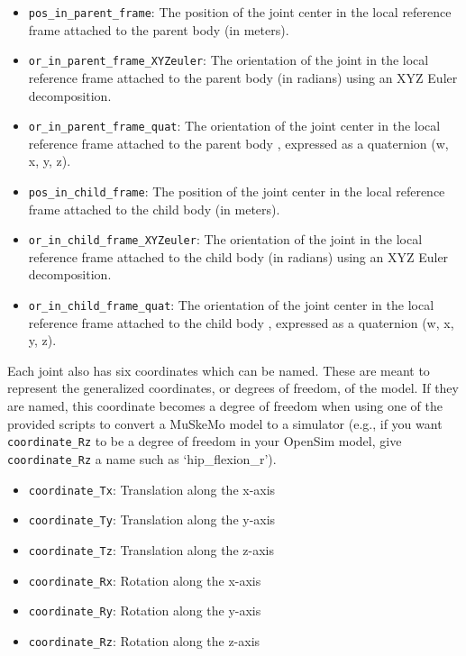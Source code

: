 \documentclass{article}
\begin{document}
\begin{itemize}
    \item \texttt{pos\_in\_parent\_frame}: The position of the joint center in the local reference frame attached to the parent body (in meters).
    \item \texttt{or\_in\_parent\_frame\_XYZeuler}: The orientation of the joint in the local reference frame attached to the parent body (in radians) using an XYZ Euler decomposition.
    \item \texttt{or\_in\_parent\_frame\_quat}: The orientation of the joint center in the local reference frame attached to the parent body , expressed as a quaternion (w, x, y, z).
    \item \texttt{pos\_in\_child\_frame}: The position of the joint center in the local reference frame attached to the child body (in meters).
    \item \texttt{or\_in\_child\_frame\_XYZeuler}: The orientation of the joint in the local reference frame attached to the child body (in radians) using an XYZ Euler decomposition.
    \item \texttt{or\_in\_child\_frame\_quat}: The orientation of the joint center in the local reference frame attached to the child body , expressed as a quaternion (w, x, y, z).
\end{itemize}

Each joint also has six coordinates which can be named. These are meant to represent the generalized coordinates, or degrees of freedom, of the model. If they are named, this coordinate becomes a degree of freedom when using one of the provided scripts to convert a MuSkeMo model to a simulator (e.g., if you want \texttt{coordinate\_Rz} to be a degree of freedom in your OpenSim model, give \texttt{coordinate\_Rz} a name such as ‘hip\_flexion\_r’).

\begin{itemize}
    \item \texttt{coordinate\_Tx}: Translation along the x-axis
    \item \texttt{coordinate\_Ty}: Translation along the y-axis
    \item \texttt{coordinate\_Tz}: Translation along the z-axis
    \item \texttt{coordinate\_Rx}: Rotation along the x-axis
    \item \texttt{coordinate\_Ry}: Rotation along the y-axis
    \item \texttt{coordinate\_Rz}: Rotation along the  z-axis
\end{itemize}
\end{document}
